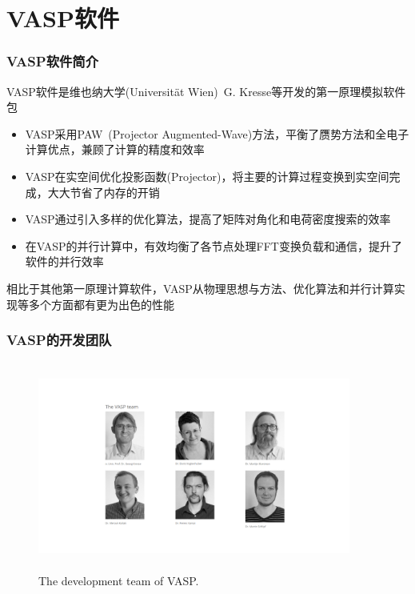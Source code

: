 \small
\section{\rm{VASP}软件}
\frame
{
	\frametitle{\textrm{VASP}软件简介}
	\textrm{VASP}软件是维也纳大学\textrm{(Universit\"at Wien)}~\textrm{G. Kresse}等开发的第一原理模拟软件包
	\begin{itemize}
		\item \textrm{VASP}采用\textrm{PAW~(Projector Augmented-Wave)}方法，平衡了赝势方法和全电子计算优点，兼顾了计算的精度和效率
		\item \textrm{VASP}在实空间优化投影函数\textrm{(Projector)}，将主要的计算过程变换到实空间完成，大大节省了内存的开销%
		\item \textrm{VASP}通过引入多样的优化算法，提高了矩阵对角化和电荷密度搜索的效率
		\item 在\textrm{VASP}的并行计算中，有效均衡了各节点处理\textrm{FFT}变换负载和通信，提升了软件的并行效率
	\end{itemize}
	相比于其他第一原理计算软件，\textrm{VASP}从物理思想与方法、优化算法和并行计算实现等多个方面都有更为出色的性能
}

\frame
{
	\frametitle{\textrm{VASP}的开发团队}
\begin{figure}[h!]
\centering
\vspace*{-0.25in}
\includegraphics[height=2.70in,width=4.05in,viewport=330 130 1280 770,clip]{Figures/VASP_team.png}
\caption{\tiny \textrm{The development team of VASP.}}%
\label{VASP_team}
\end{figure}
}

